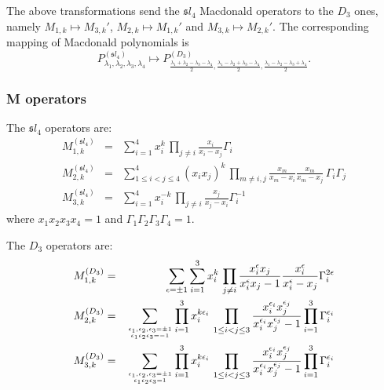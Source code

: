 \documentclass[12pt]{amsart}
\numberwithin{equation}{section}
\numberwithin{table}{section}
\begin{document}
\begin{appendix}
The above transformations send the ${\mathfrak sl}_4$ Macdonald operators to the $D_3$ ones,
namely $M_{1,k}\mapsto M_{3,k}'$, $M_{2,k}\mapsto M_{1,k}'$ and $M_{3,k}\mapsto M_{2,k}'$.
The corresponding mapping of Macdonald polynomials is
\begin{equation}
\label{maPsl4tod3}
P_{\lambda_1,\lambda_2,\lambda_3,\lambda_4}^{({\mathfrak sl}_4)}\mapsto P_{\frac{\lambda_1+\lambda_2-\lambda_3-\lambda_4}{2},\frac{\lambda_1-\lambda_2+\lambda_3-\lambda_4}{2},\frac{\lambda_1-\lambda_2-\lambda_3+\lambda_4}{2}}^{(D_3)} .
\end{equation}



\subsubsection{M operators}

The ${\mathfrak sl}_4$ operators are:
\begin{eqnarray*}
M_{1,k}^{({\mathfrak sl}_4)}&=&\sum_{i=1}^4 x_i^k\, \prod_{j\neq i} \frac{x_i}{x_i-x_j} \Gamma_i \\
M_{2,k}^{({\mathfrak sl}_4)}&=&\sum_{1\leq i<j\leq 4}^4 (x_i x_j)^k\, \prod_{m\neq i,j}  \frac{x_m}{x_m-x_i}\frac{x_m}{x_m-x_j}\, \Gamma_i\Gamma_j\\
M_{3,k}^{({\mathfrak sl}_4)}&=&\sum_{i=1}^4 x_i^{-k}\, \prod_{j\neq i} \frac{x_j}{x_j-x_i} \Gamma_i^{-1}
\end{eqnarray*}
where $x_1x_2x_3x_4=1$ and $\Gamma_1\Gamma_2\Gamma_3\Gamma_4=1$.

The $D_3$ operators are:
\begin{eqnarray*}
M_{1,k}^{(D_3)}&=&\sum_{\epsilon=\pm 1} \sum_{i=1}^3 x_i^k\, \prod_{j\neq i}\frac{x_i^\epsilon x_j}{x_i^\epsilon x_j-1} \frac{x_i^\epsilon}{x_i^\epsilon-x_j}\Gamma_i^{2\epsilon} \\
M_{2,k}^{(D_3)}&=&\sum_{\epsilon_1,\epsilon_2,\epsilon_3=\pm 1\atop
\epsilon_1\epsilon_2\epsilon_3=-1} \prod_{i=1}^3 x_i^{k\epsilon_i}\, \prod_{1\leq i<j\leq 3} \frac{x_i^{\epsilon_i} x_j^{\epsilon_j}}{x_i^{\epsilon_i} x_j^{\epsilon_j}-1} \prod_{i=1}^3 \Gamma_i^{\epsilon_i}\\
M_{3,k}^{(D_3)}&=&\sum_{\epsilon_1,\epsilon_2,\epsilon_3=\pm 1\atop
\epsilon_1\epsilon_2\epsilon_3=1} \prod_{i=1}^3 x_i^{k\epsilon_i}\, \prod_{1\leq i<j\leq 3} \frac{x_i^{\epsilon_i} x_j^{\epsilon_j}}{x_i^{\epsilon_i} x_j^{\epsilon_j}-1} \prod_{i=1}^3 \Gamma_i^{\epsilon_i}
\end{eqnarray*}


\end{appendix}
\end{document}
